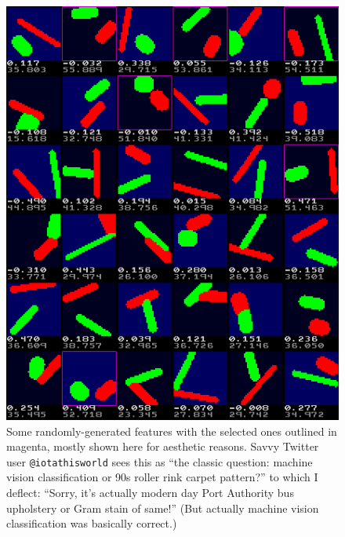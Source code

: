 \documentclass[twocolumn]{article} %
\begin{document}
\begin{figure}[ht]
\centering
  \includegraphics[width=0.99 \linewidth]{makefeatures}
  \caption{ Some randomly-generated features with the selected ones
    outlined in magenta, mostly shown here for aesthetic reasons.
    Savvy Twitter user {\tt @iotathisworld} sees this as ``the classic
    question: machine vision classification or 90s roller rink carpet
    pattern?'' to which I deflect: ``Sorry, it's actually modern day
    Port Authority bus upholstery or Gram stain of same!'' (But
    actually machine vision classification was basically correct.)
  } \label{fig:makefeatures}
\end{figure}
\end{document}
